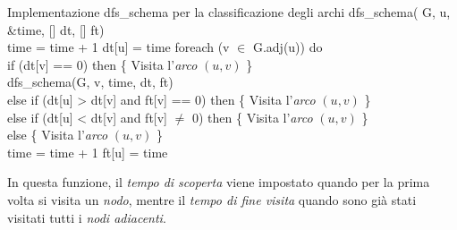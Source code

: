 \begin{code}{Implementazione dfs\_schema per la classificazione degli archi}
\noindent\rmbreak\ind dfs\_schema( G,  u,  \&time, [] dt, [] ft)\\
    time = time + 1\hfill{}
    dt[u] = time\hfill{}
    foreach (v $\in$ G.adj(u)) do\\
        \indf if (dt[v] == 0) then\hfill{}
            \indff\{ Visita l'\emph{arco} $(u,v)$ \}\\
            dfs\_schema(G, v, time, dt, ft)\\
        \indf else if (dt[u] > dt[v] and ft[v] == 0) then\hfill{}
            \indff\{ Visita l'\emph{arco} $(u,v)$ \}\\
        \indf else if (dt[u] < dt[v] and ft[v] $\neq$ 0) then\hfill{}
            \indff\{ Visita l'\emph{arco} $(u,v)$ \}\\
        \indf else\hfill{}
            \indff \{ Visita l'\emph{arco} $(u,v)$ \}\\
    \ind time = time + 1\hfill{}
    \ind ft[u] = time\hfill{}
\end{code}\noindent
In questa funzione, il \emph{tempo di scoperta} viene impostato quando per la prima
volta si visita un \emph{nodo}, mentre il \emph{tempo di fine visita} quando sono
già stati visitati tutti i \emph{nodi adiacenti}.

